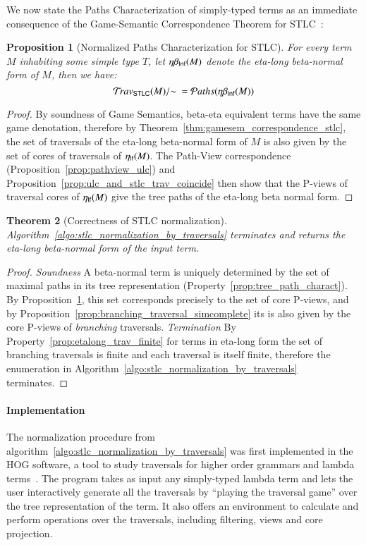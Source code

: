 \documentclass{elsarticle}
\theoremstyle{plain}
\newtheorem{theorem}{Theorem}[section]
\newtheorem{proposition}[theorem]{Proposition}
\theoremstyle{definition}
\theoremstyle{remark}
\newcommand{\travstlc}{{\travset_{\sf STLC}}}
\newcommand\pathset{{\mathcal{P}aths}} %
\begin{document}
We now state the Paths Characterization of simply-typed terms as an immediate consequence of the Game-Semantic Correspondence Theorem for STLC~\cite{BlumPhd}:
\begin{proposition}[Normalized Paths Characterization for STLC]
\label{prop:path_charact_stlc}
For every term $M$ inhabiting some simple type $T$, let $\eta\beta_{\sf lnf}(M)$ denote the eta-long beta-normal form of $M$, then we have:
\begin{equation*}
\travstlc(M)/{\sim}\ = \pathset(\etabetalnf{M})
\end{equation*}
\end{proposition}
\begin{proof}
 By soundness of Game Semantics, beta-eta equivalent terms have the same game denotation, therefore by Theorem~\ref{thm:gamesem_correspondence_stlc}, the set of traversals of the eta-long beta-normal form of $M$ is also given by the set of cores of traversals of $\eta_{\sf lf}(M)$. The Path-View correspondence (Proposition~\ref{prop:pathview_ulc}) and Proposition~\ref{prop:ulc_and_stlc_trav_coincide} then show that the P-views of traversal cores of $\eta_{\sf lf}(M)$ give the tree paths of the eta-long beta normal form.
\end{proof}



\begin{theorem}[Correctness of STLC normalization]
Algorithm~\ref{algo:stlc_normalization_by_traversals} terminates and returns the eta-long beta-normal form of the input term.
\end{theorem}
\begin{proof}
\emph{Soundness} A beta-normal term is uniquely determined by the set of maximal paths in its tree representation (Property~\ref{prop:tree_path_charact}). By Proposition~\ref{prop:path_charact_stlc}, this set corresponds precisely to the set of core P-views,
and by Proposition~\ref{prop:branching_traversal_simcomplete} its is also given by the core P-views of \emph{branching} traversals.
\emph{Termination} By Property~\ref{prop:etalong_trav_finite} for terms in eta-long form the set of branching traversals is finite and each traversal is itself finite, therefore the enumeration in Algorithm~\ref{algo:stlc_normalization_by_traversals} terminates.
\end{proof}


\paragraph{Implementation} The normalization procedure from algorithm~\ref{algo:stlc_normalization_by_traversals} was first implemented in the HOG software, a tool to study traversals for higher order grammars and lambda terms~\cite{BlumGalop2008, BlumPhd,BlumHogTool2008}. The program takes as input any simply-typed lambda term and lets the user interactively generate all the traversals by ``playing the traversal game'' over the tree representation of the term. It also offers an  environment to calculate and perform operations over the traversals, including filtering, views and core projection.
\end{document}
